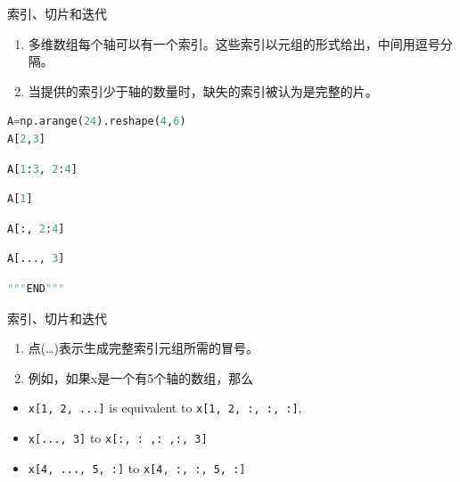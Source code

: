 \documentclass[ignorenonframetext,11pt,xcolor=dvipsnames,hyperref={colorlinks,allcolors=.,urlcolor=blue, citecolor=violet, bookmarksdepth=4},aspectratio=1610]{beamer}
\providecommand{\tightlist}{%
  \setlength{\itemsep}{0pt}\setlength{\parskip}{0pt}}
\newcommand{\passthrough}[1]{#1}
\begin{document}
\begin{frame}[fragile]{索引、切片和迭代}
\protect\hypertarget{section-12}{}

\begin{enumerate}
\tightlist
\item
  多维数组每个轴可以有一个索引。这些索引以元组的形式给出，中间用逗号分隔。
\item
  当提供的索引少于轴的数量时，缺失的索引被认为是完整的片。
\end{enumerate}

\begin{lstlisting}[language=Python]
A=np.arange(24).reshape(4,6)
A[2,3]
\end{lstlisting}

\begin{lstlisting}[language=Python]
A[1:3, 2:4]
\end{lstlisting}

\begin{lstlisting}[language=Python]
A[1]
\end{lstlisting}

\begin{lstlisting}[language=Python]
A[:, 2:4]
\end{lstlisting}

\begin{lstlisting}[language=Python]
A[..., 3]
\end{lstlisting}

\begin{lstlisting}[language=Python]
"""END"""
\end{lstlisting}

\end{frame}

\begin{frame}[fragile]{索引、切片和迭代}
\protect\hypertarget{section-13}{}

\begin{enumerate}
\tightlist
\item
  点(\ldots)表示生成完整索引元组所需的冒号。
\item
  例如，如果x是一个有5个轴的数组，那么
\end{enumerate}

\begin{itemize}
\tightlist
\item
  \passthrough{\lstinline!x[1, 2, ...]!} is equivalent to
  \passthrough{\lstinline!x[1, 2, :, :, :]!},
\item
  \passthrough{\lstinline!x[..., 3]!} to
  \passthrough{\lstinline!x[:, : ,: ,:, 3]!}
\item
  \passthrough{\lstinline!x[4, ..., 5, :]!} to
  \passthrough{\lstinline!x[4, :, :, 5, :]!}
\end{itemize}

\end{frame}
\end{document}
